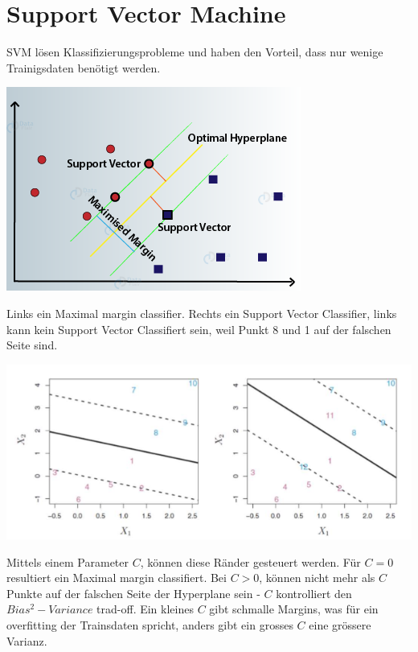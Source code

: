 \section{Support Vector Machine}
SVM lösen Klassifizierungsprobleme und haben den Vorteil, dass nur wenige Trainigsdaten benötigt werden. 
\begin{center}
	\includegraphics[width=0.7\columnwidth]{Images/svm_details}
\end{center}

Links ein Maximal margin classifier. Rechts ein Support Vector Classifier, links kann kein Support Vector Classifiert sein, weil Punkt 8 und 1 auf der falschen Seite sind.
\begin{center}
	\includegraphics[width=\columnwidth]{Images/svm}
\end{center}

Mittels einem Parameter $C$, können diese Ränder gesteuert werden. Für $C=0$ resultiert ein Maximal margin classifiert. Bei $C\gt0$, können nicht mehr als $C$ Punkte auf der falschen Seite der Hyperplane sein -  $C$ kontrolliert den $Bias^2-Variance$ trad-off. Ein kleines $C$ gibt schmalle Margins, was für ein overfitting der Trainsdaten spricht, anders gibt ein grosses $C$ eine grössere Varianz.